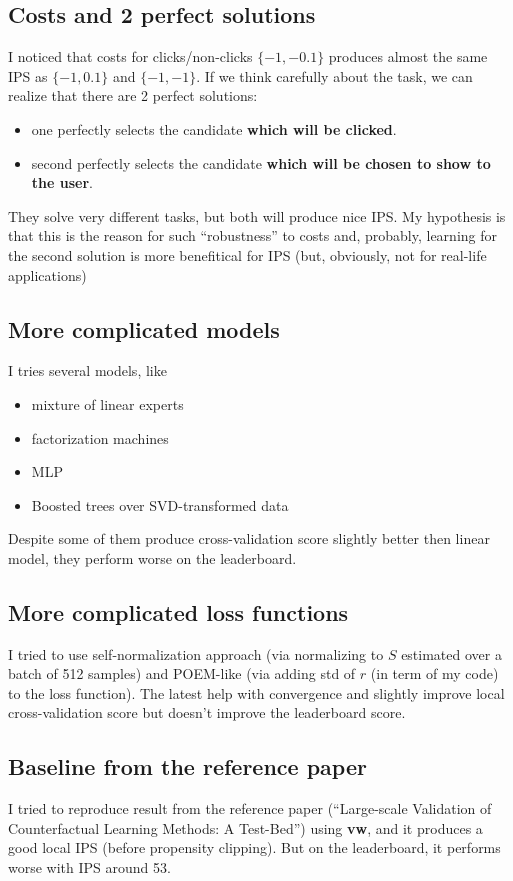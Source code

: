 \documentclass[12pt]{article}
\begin{document}
\subsection{Costs and 2 perfect solutions}
I noticed that costs for clicks/non-clicks $\{-1, -0.1\}$ produces almost the same IPS as $\{-1, 0.1\}$ and $\{-1, -1\}$. 
If we think carefully about the task, we can realize that there are 2 perfect solutions: 
\begin{itemize}
    \item one perfectly selects the candidate \textbf{which will be clicked}.
    \item second perfectly selects the candidate \textbf{which will be chosen to show to the user}.
\end{itemize}

They solve very different tasks, but both will produce nice IPS.
My hypothesis is that this is the reason for such ``robustness'' to costs and, probably, learning for the second solution is more benefitical for IPS (but, obviously, not for real-life applications)

\subsection{More complicated models}
I tries several models, like 
\begin{itemize}
    \item mixture of linear experts
    \item factorization machines
    \item MLP
    \item Boosted trees over SVD-transformed data
\end{itemize}

Despite some of them produce cross-validation score slightly better then linear model, they perform worse on the leaderboard.

\subsection{More complicated loss functions}
I tried to use self-normalization approach (via normalizing to $S$ estimated over a batch of 512 samples) and POEM-like (via adding std of $r$ (in term of my code) to the loss function). The latest help with convergence and slightly improve local cross-validation score but doesn't improve the leaderboard score.

\subsection{Baseline from the reference paper}
I tried to reproduce result from the reference paper (``Large-scale Validation of Counterfactual Learning Methods: A Test-Bed'') using \textbf{vw}, and it produces a good local IPS (before propensity clipping). But on the leaderboard, it performs worse with IPS around 53.
\end{document}
